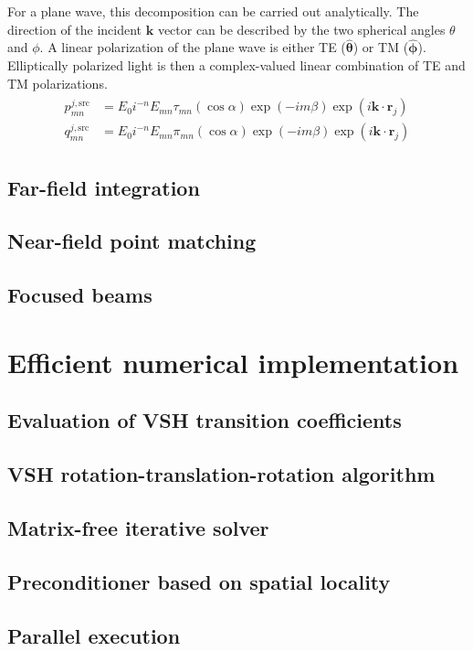 \documentclass[11pt]{article}
\begin{document}
For a plane wave, this decomposition can be carried out analytically.
The direction of the incident $\bm{k}$ vector can be described by the two spherical angles $\theta$ and $\phi$.
A linear polarization of the plane wave is either TE ($\bm{\hat \theta}$) or TM ($\bm{\hat \phi}$).
Elliptically polarized light is then a complex-valued linear combination of TE and TM polarizations.
\begin{align}
\begin{split}
p_{mn}^{j,\text{src}} &= E_0 i^{-n} E_{mn} \tau_{mn}(\cos \alpha) \exp(-im\beta) \exp(i\bm{k} \cdot \bm{r}_j) \\
q_{mn}^{j,\text{src}} &= E_0 i^{-n} E_{mn} \pi_{mn}(\cos \alpha) \exp(-im\beta) \exp(i\bm{k} \cdot \bm{r}_j)
\end{split}
\end{align}

\subsection{Far-field integration}
\subsection{Near-field point matching}
\subsection{Focused beams}

\section{Efficient numerical implementation}
\subsection{Evaluation of VSH transition coefficients}
\subsection{VSH rotation-translation-rotation algorithm}
\subsection{Matrix-free iterative solver}
\subsection{Preconditioner based on spatial locality}
\subsection{Parallel execution}
\end{document}
